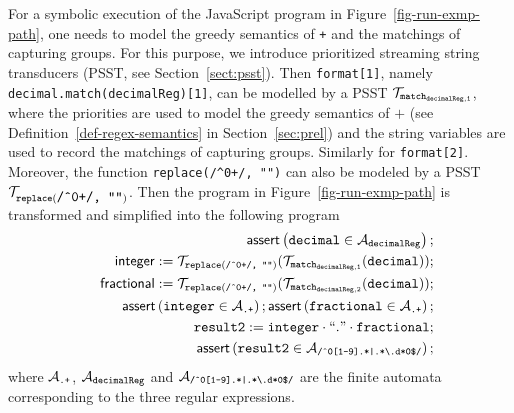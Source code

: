 For a symbolic execution of the JavaScript program in Figure~\ref{fig-run-exmp-path}, one needs to model the greedy semantics of {\tt +} and the matchings of capturing groups. For this purpose, we introduce prioritized streaming string transducers (PSST, see Section~\ref{sect:psst}). Then {\tt format[1]}, namely {\tt decimal.match(decimalReg)[1]}, can be modelled by a PSST $\mathcal{T}_{\tt match_{decimalReg,1}}$, where the priorities are used to model the greedy semantics of $+$ (see Definition~\ref{def-regex-semantics} in Section~\ref{sec:prel}) and the string variables are used to record the matchings of capturing groups. Similarly for  {\tt format[2]}. Moreover, the function {\tt replace(/\^{}0+/, "")} can also be modeled by a PSST $\mathcal{T}_{\tt replace(\mbox{\tt /\^{}0+/, ""})}$. Then the program in Figure~\ref{fig-run-exmp-path} is transformed and simplified into the following program
\begin{eqnarray}\label{eqn:exmp}
& & \textsf{assert}\left(\tt decimal \in \mathcal{A}_{decimalReg}\right);\nonumber \\
& & \sf integer  := \tt  \mathcal{T}_{\tt replace(\mbox{\scriptsize \tt /\^{}0+/, ""})}(\mathcal{T}_{\tt match_{decimalReg,1}}(decimal));\nonumber \\
& & \sf fractional  := \tt  \mathcal{T}_{\scriptsize\tt replace(\mbox{\tt /\^{}0+/, ""})}(\mathcal{T}_{\tt match_{decimalReg,2}}(decimal));\nonumber \\
&&  \textsf{assert}\left(\tt integer \in \mathcal{A}_{\scriptsize\mbox{\tt.+}}\right); 
\textsf{assert}\left(\tt fractional \in \mathcal{A}_{\scriptsize\mbox{\tt.+}}\right); \nonumber\\
 && \tt result2 := integer \cdot ``." \cdot fractional; \nonumber\\
 && \textsf{assert}\left(\tt result2 \in \mathcal{A}_{\scriptsize\mbox{\tt /\^{}0[1-9].*|.*{\scriptsize\textbackslash}.d*0\$/}}\right); 
\end{eqnarray}
where $\mathcal{A}_{\scriptsize\mbox{\tt.+}}$, $\mathcal{A}_{\tt decimalReg}$ and $\mathcal{A}_{\scriptsize\mbox{\tt /\^{}0[1-9].*|.*{\scriptsize\textbackslash}.d*0\$/}}$ are the finite automata corresponding to the three regular expressions.


